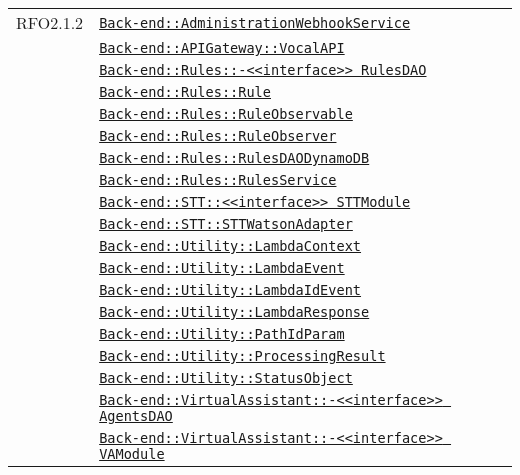 \begin{longtable}{|>{\centering}m{3cm}|m{10cm}<{\centering}|}
RFO2.1.2 & \hyperref[Back-end::AdministrationWebhookService]{\texttt{Back-end::AdministrationWebhookService}}\\
& \hyperref[Back-end::APIGateway::VocalAPI]{\texttt{Back-end::APIGateway::VocalAPI}}\\
& \hyperref[Back-end::Rules::<<interface>> RulesDAO]{\texttt{Back-end::Rules::-\linebreak <<interface>> RulesDAO}}\\
& \hyperref[Back-end::Rules::Rule]{\texttt{Back-end::Rules::Rule}}\\
& \hyperref[Back-end::Rules::RuleObservable]{\texttt{Back-end::Rules::RuleObservable}}\\
& \hyperref[Back-end::Rules::RuleObserver]{\texttt{Back-end::Rules::RuleObserver}}\\
& \hyperref[Back-end::Rules::RulesDAODynamoDB]{\texttt{Back-end::Rules::RulesDAODynamoDB}}\\
& \hyperref[Back-end::Rules::RulesService]{\texttt{Back-end::Rules::RulesService}}\\
& \hyperref[Back-end::STT::<<interface>> STTModule]{\texttt{Back-end::STT::<<interface>> STTModule}}\\
& \hyperref[Back-end::STT::STTWatsonAdapter]{\texttt{Back-end::STT::STTWatsonAdapter}}\\
& \hyperref[Back-end::Utility::LambdaContext]{\texttt{Back-end::Utility::LambdaContext}}\\
& \hyperref[Back-end::Utility::LambdaEvent]{\texttt{Back-end::Utility::LambdaEvent}}\\
& \hyperref[Back-end::Utility::LambdaIdEvent]{\texttt{Back-end::Utility::LambdaIdEvent}}\\
& \hyperref[Back-end::Utility::LambdaResponse]{\texttt{Back-end::Utility::LambdaResponse}}\\
& \hyperref[Back-end::Utility::PathIdParam]{\texttt{Back-end::Utility::PathIdParam}}\\
& \hyperref[Back-end::Utility::ProcessingResult]{\texttt{Back-end::Utility::ProcessingResult}}\\
& \hyperref[Back-end::Utility::StatusObject]{\texttt{Back-end::Utility::StatusObject}}\\
& \hyperref[Back-end::VirtualAssistant::<<interface>> AgentsDAO]{\texttt{Back-end::VirtualAssistant::-\linebreak <<interface>> AgentsDAO}}\\
& \hyperref[Back-end::VirtualAssistant::<<interface>> VAModule]{\texttt{Back-end::VirtualAssistant::-\linebreak <<interface>> VAModule}}\\

\end{longtable}
